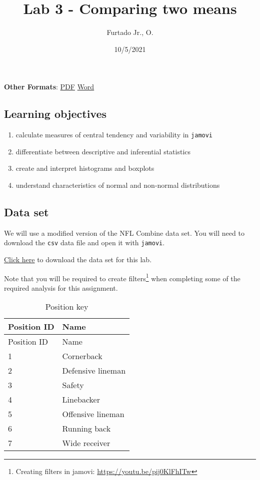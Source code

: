 \documentclass[
]{article}
\title{Lab 3 - Comparing two means}
\author{Furtado Jr., O.}
\date{10/5/2021}
\providecommand{\tightlist}{%
  \setlength{\itemsep}{0pt}\setlength{\parskip}{0pt}}
\begin{document}
\maketitle

\textbf{Other Formats}: \href{ds1.pdf}{PDF} \textbar{}
\href{ds1.docx}{Word}

\hypertarget{learning-objectives}{%
\subsection{Learning objectives}\label{learning-objectives}}

\begin{enumerate}
\def\labelenumi{\arabic{enumi}.}
\tightlist
\item
  calculate measures of central tendency and variability in
  \texttt{jamovi}
\item
  differentiate between descriptive and inferential statistics
\item
  create and interpret histograms and boxplots
\item
  understand characteristics of normal and non-normal distributions
\end{enumerate}

\hypertarget{data-set}{%
\subsection{Data set}\label{data-set}}

We will use a modified version of the NFL Combine data set. You will
need to download the \texttt{csv} data file and open it with
\texttt{jamovi}.

\href{./datasets/data-labs.csv}{Click here} to download the data set for
this lab.

Note that you will be required to create filters\footnote{Creating
  filters in jamovi: \url{https://youtu.be/pij0KlFhITw}} when completing
some of the required analysis for this assignment.

\begin{longtable}[]{@{}ll@{}}
\caption{Position key}\tabularnewline
\toprule
Position ID & Name \\
\midrule
\endfirsthead
\toprule
Position ID & Name \\
\midrule
\endhead
1 & Cornerback \\
2 & Defensive lineman \\
3 & Safety \\
4 & Linebacker \\
5 & Offensive lineman \\
6 & Running back \\
7 & Wide receiver \\
\bottomrule
\end{longtable}
\end{document}
